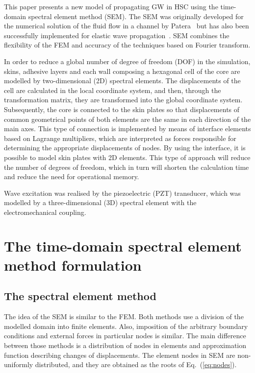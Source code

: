 \documentclass[a4paper,12pt]{article}
\begin{document}
This paper presents a new model of propagating GW in HSC using the time-domain 
spectral element method (SEM).
The SEM was originally developed for the numerical solution of the fluid flow 
in a channel by Patera~\cite{patera1984spectral} but has also been successfully 
implemented for elastic wave propagation~\cite{ostachowicz2011guided}.
SEM combines the flexibility of the FEM and accuracy of the techniques based on 
Fourier transform. 

In order to reduce a global number of degree of freedom (DOF) in the 
simulation, skins, adhesive layers and each wall composing a hexagonal cell of 
the core are modelled by two-dimensional (2D) spectral elements.
The displacements of the cell are calculated in the local coordinate system, 
and then, through the transformation matrix, they are transformed into the 
global coordinate system. Subsequently, the core is connected to the skin 
plates so that displacements of common geometrical points of both elements are 
the same in each direction of the main axes.
This type of connection is implemented by means of interface elements based on 
Lagrange multipliers, which are interpreted as forces responsible for 
determining the appropriate displacements of nodes.
By using the interface, it is possible to model skin plates with 2D elements.
This type of approach will reduce the number of degrees of freedom, which in 
turn will shorten the calculation time and reduce the need for operational 
memory.

Wave excitation was realised by the piezoelectric (PZT) transducer, which was 
modelled by a three-dimensional (3D) spectral element with the 
electromechanical coupling.
\section{The time-domain spectral element method formulation}
\label{sec:time_SEM}
\subsection{The spectral element method}
\label{sec:sem}
The idea of the SEM is similar to the FEM.
Both methods use a division of the modelled domain into finite elements.
Also, imposition of the arbitrary boundary conditions and external forces in 
particular nodes is similar.
The main difference between those methods is a distribution of nodes in 
elements and approximation function describing changes of displacements.
The element nodes in SEM are non-uniformly distributed, and they are obtained 
as the roots of Eq.~(\ref{eq:nodes}).
\end{document}
